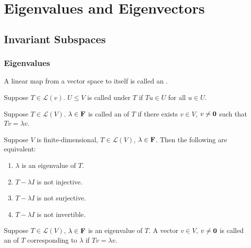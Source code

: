 \chapter{Eigenvalues and Eigenvectors}
\section{Invariant Subspaces}
\subsection{Eigenvalues}
\begin{definition}[Operator]
A linear map from a vector space to itself is called an .
\end{definition}

\begin{definition}
Suppose $T\in\mathcal{L}(v)$. $U\le V$ is called  under $T$ if $Tu\in U$ for all $u\in U$.
\end{definition}

\begin{definition}[Eigenvalue]
Suppose $T\in\mathcal{L}(V)$. $\lambda\in\mathbf F$ is called an  of $T$ if there exists $v\in V$, $v\neq\vb{0}$ such that $Tv=\lambda v$.
\end{definition}

\begin{lemma}
Suppose $V$ is finite-dimensional, $T\in\mathcal{L}(V)$, $\lambda\in\mathbf F$. Then the following are equivalent:
\begin{enumerate}[label=(\arabic*)]
\item $\lambda$ is an eigenvalue of $T$.
\item $T-\lambda I$ is not injective.
\item $T-\lambda I$ is not surjective.
\item $T-\lambda I$ is not invertible.
\end{enumerate}
\end{lemma}

\begin{definition}[Eigenvector]
Suppose $T\in\mathcal{L}(V)$, $\lambda\in\mathbf F$ is an eigenvalue of $T$. A vector $v\in V$, $v\neq\vb{0}$ is called an  of $T$ corresponding to $\lambda$ if $Tv=\lambda v$.
\end{definition}

